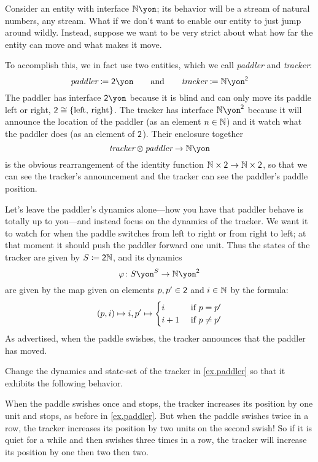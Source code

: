 \documentclass[Book-Poly]{subfiles}
\begin{document}
\begin{example}[Paddling]\label{ex.paddler}
Consider an entity with interface $\nn\yon$; its behavior will be a stream of natural numbers, any stream. What if we don't want to enable our entity to just jump around wildly. Instead, suppose we want to be very strict about what how far the entity can move and what makes it move.

To accomplish this, we in fact use two entities, which we call \emph{paddler} and \emph{tracker}:
\[
  \textit{paddler}\coloneqq\2\yon
  \qqand
  \textit{tracker}\coloneqq\nn\yon^\2
\]
The paddler has interface $\2\yon$ because it is blind and can only move its paddle left or right, $\textsf{2}\cong\{\text{left, right}\}$. The tracker has interface $\nn\yon^\2$ because it will announce the location of the paddler (as an element $n\in\mathbb{N}$) and it watch what the paddler does (as an element of $\textsf{2}$). Their enclosure together
\[
\textit{tracker}\otimes\textit{paddler}\to\nn\yon
\]
is the obvious rearrangement of the identity function $\mathbb{N}\times\textsf{2}\to\mathbb{N}\times\textsf{2}$, so that we can see the tracker's announcement and the tracker can see the paddler's paddle position.

Let's leave the paddler's dynamics alone---how you have that paddler behave is totally up to you---and instead focus on the dynamics of the tracker. We want it to watch for when the paddle switches from left to right or from right to left; at that moment it should push the paddler forward one unit. Thus the states of the tracker are given by $S\coloneqq\textsf{2}\mathbb{N}$, and its dynamics
\[\varphi\colon S\yon^S\to\nn\yon^\2\]
are given by the map given on elements $p,p'\in\textsf{2}$ and $i\in\mathbb{N}$ by the formula:
\[
  (p,i)\mapsto i,p'\mapsto
	\begin{cases}
		i&\textnormal{ if }p=p'\\
		i+1&\textnormal{ if }p\neq p'
	\end{cases}
\]
As advertised, when the paddle swishes, the tracker announces that the paddler has moved.
\end{example}

\begin{exercise}
Change the dynamics and state-set of the tracker in \cref{ex.paddler} so that it exhibits the following behavior.

When the paddle swishes once and stops, the tracker increases its position by one unit and stops, as before in \cref{ex.paddler}. But when the paddle swishes twice in a row, the tracker increases its position by two units on the second swish! So if it is quiet for a while and then swishes three times in a row, the tracker will increase its position by one then two then two.
\end{exercise}
\end{document}
